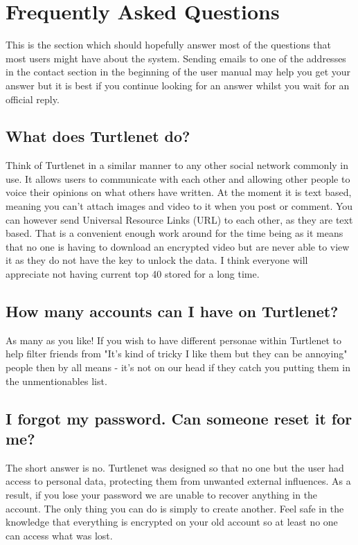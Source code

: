 \section{Frequently Asked Questions}
This is the section which should hopefully answer most of the questions that
most users might have about the system.  Sending emails to one of the addresses 
in the contact section in the beginning of the user manual may help you get your
answer but it is best if you continue looking for an answer whilst you wait for
an official reply.

\subsection{What does Turtlenet do?}
Think of Turtlenet in a similar manner to any other social network commonly in
use.  It allows users to communicate with each other and allowing other people
to voice their opinions on what others have written.  At the moment it is text
based, meaning you can't attach images and video to it when you post or comment.
You can however send Universal Resource Links (URL) to each other, as they are
text based.  That is a convenient enough work around for the time being as it
means that no one is having to download an encrypted video but are never able to
view it as they do not have the key to unlock the data.  I think everyone will
appreciate not having current top 40 stored for a long time.

\subsection{How many accounts can I have on Turtlenet?}
As many as you like!  If you wish to have different personae within Turtlenet to
help filter friends from "It's kind of tricky I like them but they can be 
annoying" people then by all means - it's not on our head if they catch you 
putting them in the unmentionables list.

\subsection{I forgot my password.  Can someone reset it for me?}
The short answer is no.  Turtlenet was designed so that no one but the user had
access to personal data, protecting them from unwanted external influences.  As
a result, if you lose your password we are unable to recover anything in the
account.  The only thing you can do is simply to create another.  Feel safe in 
the knowledge that everything is encrypted on your old account so at least no 
one can access what was lost.

